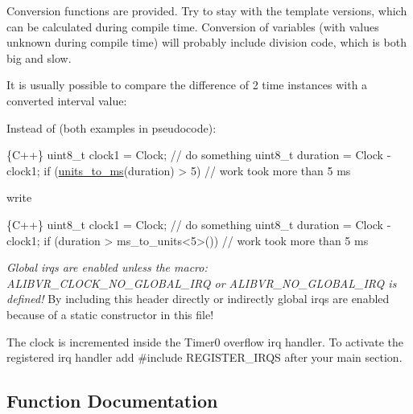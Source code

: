 Conversion functions are provided. Try to stay with the template versions, which can be calculated during compile time. Conversion of variables (with values unknown during compile time) will probably include division code, which is both big and slow.

It is usually possible to compare the difference of 2 time instances with a converted interval value\+:

Instead of (both examples in pseudocode)\+:


\begin{DoxyCode}
\{C++\}
uint8\_t clock1 = Clock;
\textcolor{comment}{// do something}
uint8\_t duration = Clock - clock1;
\textcolor{keywordflow}{if} (\hyperlink{namespaceclock_a47af3a8ffbea7eb40a79905155e751d3}{units\_to\_ms}(duration) > 5) \textcolor{comment}{// work took more than 5 ms}
\end{DoxyCode}


write


\begin{DoxyCode}
\{C++\}
uint8\_t clock1 = Clock;
\textcolor{comment}{// do something}
uint8\_t duration = Clock - clock1;
\textcolor{keywordflow}{if} (duration > ms\_to\_units<5>()) \textcolor{comment}{// work took more than 5 ms}
\end{DoxyCode}


{\itshape Global irqs are enabled unless the macro\+: {\ttfamily A\+L\+I\+B\+V\+R\+\_\+\+C\+L\+O\+C\+K\+\_\+\+N\+O\+\_\+\+G\+L\+O\+B\+A\+L\+\_\+\+I\+RQ} or {\ttfamily A\+L\+I\+B\+V\+R\+\_\+\+N\+O\+\_\+\+G\+L\+O\+B\+A\+L\+\_\+\+I\+RQ} is defined!} By including this header directly or indirectly global irqs are enabled because of a static constructor in this file!

The clock is incremented inside the {\ttfamily Timer0} overflow irq handler. To activate the registered irq handler add {\ttfamily \#include R\+E\+G\+I\+S\+T\+E\+R\+\_\+\+I\+R\+QS} after your {\ttfamily main} section. 

\subsection{Function Documentation}
